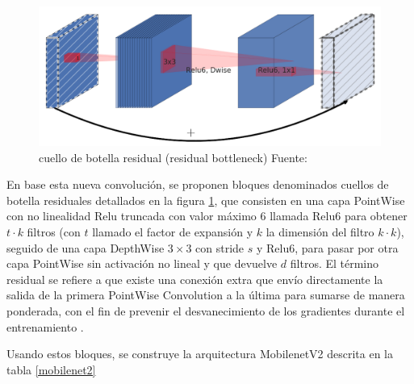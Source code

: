         	\begin{figure}[H]
        		\centering
        		\includegraphics[scale=0.25]{imagenes/bottleneck}
        		\caption[Cuello de botella residual]{cuello de botella residual (residual bottleneck) Fuente:\citep{8578572}}
        		\label{bottleneck}
        	\end{figure}
        	
        	En base esta nueva convolución, se proponen bloques denominados cuellos de botella residuales detallados en la figura \ref{bottleneck}, que consisten en una capa PointWise con no linealidad Relu truncada con valor máximo 6 llamada Relu6 para obtener $t\cdot k$ filtros (con $t$ llamado el factor de expansión y $k$ la dimensión del filtro $k\cdot k$), seguido de una capa DepthWise $3\times3$ con stride $s$ y Relu6, para pasar por otra capa PointWise sin activación no lineal y que devuelve $d$ filtros. El término residual se refiere a que existe una conexión extra que envío directamente la salida de la primera PointWise Convolution a la última para sumarse de manera ponderada, con el fin de prevenir el desvanecimiento de los gradientes durante el entrenamiento \citep{8578572}.
        	
        
        	Usando estos bloques, se construye la arquitectura MobilenetV2 descrita en la tabla \ref{mobilenet2}
        	

